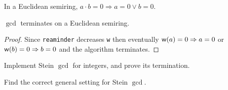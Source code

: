 \begin{lemma}
	In a Euclidean semiring, $a \cdot b = 0 \Rightarrow a = 0 \vee b = 0$.
\end{lemma}

\begin{lemma}
	$\gcd$ terminates on a Euclidean semiring.
\end{lemma}

\begin{proof}
	Since \verb|reaminder| decreases \verb|w| then eventually $\mathsf{w}(a) = 0 \Rightarrow a = 0$ or
	$\mathsf{w}(b) = 0 \Rightarrow b = 0$ and the algorithm terminates.
\end{proof}

\begin{exercise}
	Implement Stein $\gcd$ for integers, and prove its termination.
\end{exercise}

\begin{project}
	Find the correct general setting for Stein $\gcd$.
\end{project}
